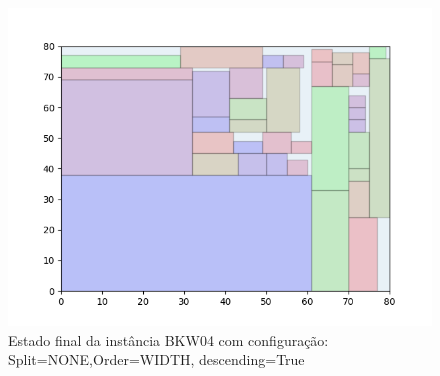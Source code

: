 \begin{figure}[H]
    \centering
    \caption[]{Estado final da instância BKW04 com configuração: Split=NONE,Order=WIDTH, descending=True}
    \label{fig:bkw04-none-width-true}
    \includegraphics[scale=0.5]{output/figures/bkw/bkw04/none/width/true/00}
\end{figure}